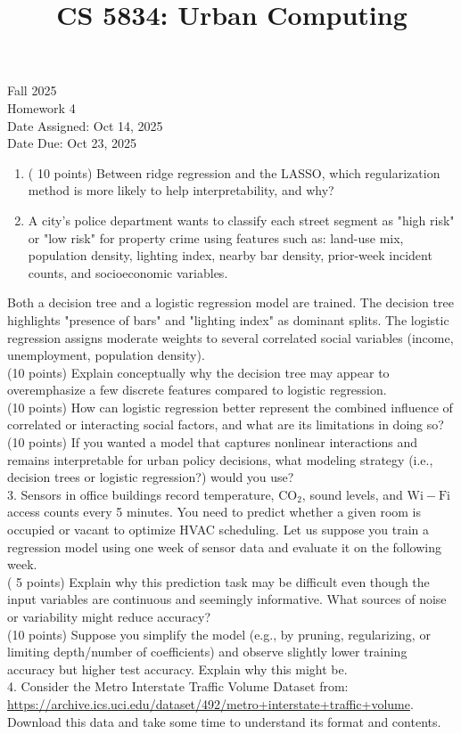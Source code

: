 \documentclass[10pt]{article}
\title{CS 5834: Urban Computing }
\author{}
\date{}
\begin{document}
\maketitle
Fall 2025\\
Homework 4\\
Date Assigned: Oct 14, 2025\\
Date Due: Oct 23, 2025

\begin{enumerate}
  \item ( 10 points) Between ridge regression and the LASSO, which regularization method is more likely to help interpretability, and why?
  \item A city's police department wants to classify each street segment as "high risk" or "low risk" for property crime using features such as: land-use mix, population density, lighting index, nearby bar density, prior-week incident counts, and socioeconomic variables.
\end{enumerate}

Both a decision tree and a logistic regression model are trained. The decision tree highlights "presence of bars" and "lighting index" as dominant splits. The logistic regression assigns moderate weights to several correlated social variables (income, unemployment, population density).\\
(10 points) Explain conceptually why the decision tree may appear to overemphasize a few discrete features compared to logistic regression.\\
(10 points) How can logistic regression better represent the combined influence of correlated or interacting social factors, and what are its limitations in doing so?\\
(10 points) If you wanted a model that captures nonlinear interactions and remains interpretable for urban policy decisions, what modeling strategy (i.e., decision trees or logistic regression?) would you use?\\
3. Sensors in office buildings record temperature, $\mathrm{CO}_{2}$, sound levels, and $\mathrm{Wi}-\mathrm{Fi}$ access counts every 5 minutes. You need to predict whether a given room is occupied or vacant to optimize HVAC scheduling. Let us suppose you train a regression model using one week of sensor data and evaluate it on the following week.\\
( 5 points) Explain why this prediction task may be difficult even though the input variables are continuous and seemingly informative. What sources of noise or variability might reduce accuracy?\\
(10 points) Suppose you simplify the model (e.g., by pruning, regularizing, or limiting depth/number of coefficients) and observe slightly lower training accuracy but higher test accuracy. Explain why this might be.\\
4. Consider the Metro Interstate Traffic Volume Dataset from: \href{https://archive.ics.uci.edu/dataset/492/metro+interstate+traffic+volume}{https://archive.ics.uci.edu/dataset/492/metro+interstate+traffic+volume}. Download this data and take some time to understand its format and contents.
\end{document}
